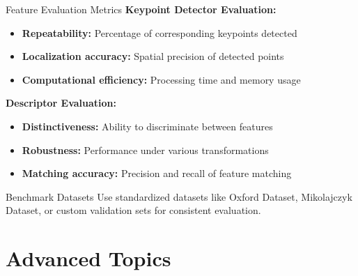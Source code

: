 \documentclass[aspectratio=169,10pt]{beamer}
\begin{document}
\begin{frame}{Feature Evaluation Metrics}
    \textbf{Keypoint Detector Evaluation:}
    \begin{itemize}
        \item \textbf{Repeatability:} Percentage of corresponding keypoints detected
        \item \textbf{Localization accuracy:} Spatial precision of detected points
        \item \textbf{Computational efficiency:} Processing time and memory usage
    \end{itemize}

    \textbf{Descriptor Evaluation:}
    \begin{itemize}
        \item \textbf{Distinctiveness:} Ability to discriminate between features
        \item \textbf{Robustness:} Performance under various transformations
        \item \textbf{Matching accuracy:} Precision and recall of feature matching
    \end{itemize}

    \begin{alertblock}{Benchmark Datasets}
        Use standardized datasets like Oxford Dataset, Mikolajczyk Dataset, or custom validation sets for consistent evaluation.
    \end{alertblock}
\end{frame}

\section{Advanced Topics}
\end{document}

